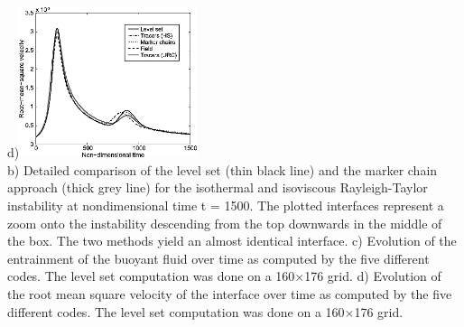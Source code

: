 \begin{itemize}
\begin{center}
d)\includegraphics[width=5.2cm]{images/benchmark_vaks97/sunh10_d}\\
{\captionfont 
b) Detailed comparison of the level set (thin black line) and the marker chain 
approach (thick grey line) for the isothermal and isoviscous Rayleigh-Taylor 
instability at nondimensional time t = 1500. The plotted interfaces represent a 
zoom onto the instability descending from the top downwards in the middle of the box. 
The two methods yield an almost identical interface. 
c) Evolution of the entrainment of the buoyant fluid over time as computed by 
the five different codes. The level set computation was done on a 160$\times$176 grid.
d) Evolution of the root mean square velocity of the interface over time 
as computed by the five different codes. The level set computation was done on a 160$\times$176 grid.}
\end{center}


\end{itemize}
